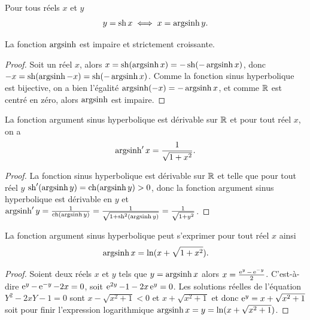 \begin{prop}
  Pour tous réels \(x\) et \(y\)
  \begin{equation}
    y = \operatorname{sh}{x} \iff x = \operatorname{argsinh} y.
  \end{equation}
\end{prop}

\begin{prop}
  La fonction \(\operatorname{argsinh}\) est impaire et strictement croissante.
\end{prop}

\begin{proof}
  Soit un réel \(x\), alors \(x = \operatorname{sh} (\operatorname{argsinh} x) = -\operatorname{sh}(-\operatorname{argsinh} x)\), donc
  \(-x = \operatorname{sh}(\operatorname{argsinh} -x) = \operatorname{sh}(-\operatorname{argsinh} x)\). Comme la fonction sinus
  hyperbolique est bijective, on a bien l'égalité \(\operatorname{argsinh}(-x) = -\operatorname{argsinh} x\),
  et comme \(\mathbb{R}\) est centré en zéro, alors \(\operatorname{argsinh}\) est impaire.
\end{proof}

\begin{prop}
  La fonction argument sinus hyperbolique est dérivable sur \(\mathbb{R}\) et pour tout
  réel \(x\), on a
  \begin{equation}
    \operatorname{argsinh}' x= \frac{1}{\sqrt{1+x^2}}.
  \end{equation}
\end{prop}

\begin{proof}
  La fonction sinus hyperbolique est dérivable sur \(\mathbb{R}\) et telle que pour
  tout réel \(y\) \(\operatorname{sh}' (\operatorname{argsinh} y) = \operatorname{ch}(\operatorname{argsinh} y)>0\), donc la fonction
  argument sinus hyperbolique est dérivable en \(y\) et \(\operatorname{argsinh}' y  =
  \frac{1}{\operatorname{ch}( \operatorname{argsinh} y)} = \frac{1}{\sqrt{1+\operatorname{sh}^2(\operatorname{argsinh} y)}} =
  \frac{1}{\sqrt{1+y^2}}\).
\end{proof}

\begin{prop}
  La fonction argument sinus hyperbolique peut s'exprimer pour tout réel \(x\)
  ainsi
  \begin{equation}
    \operatorname{argsinh}{x} = \ln(x+\sqrt{1+x^2}).
  \end{equation}
\end{prop}

\begin{proof}
  Soient deux réels \(x\) et \(y\) tels que \(y = \operatorname{argsinh} x\) alors \(x =
  \frac{\operatorname{e}^y - \operatorname{e}^{-y}}{2}\). C'est-à-dire \(\operatorname{e}^y - \operatorname{e}^{-y} -2x = 0\), soit
  \(\operatorname{e}^{2y}-1-2x\operatorname{e}^{y} = 0\). Les solutions réelles de l'équation \(Y^2-2xY-1 =
  0\) sont \(x-\sqrt{x^2+1}<0\) et \(x+\sqrt{x^2+1}\) et donc \(\operatorname{e}^y =
  x+\sqrt{x^2+1}\) soit pour finir l'expression logarithmique \(\operatorname{argsinh} x = y =
  \ln(x+\sqrt{x^2+1})\).
\end{proof}

